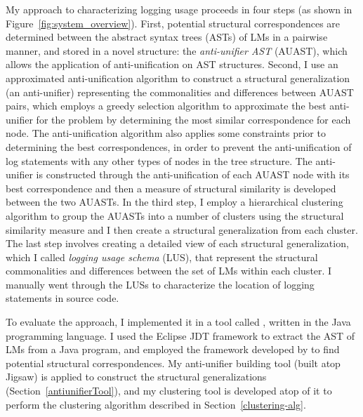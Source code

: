 My approach to characterizing logging usage proceeds in four steps (as shown in Figure~\ref{fig:system_overview}). First, potential structural correspondences are determined between the abstract syntax trees (ASTs) of LMs in a pairwise manner, and stored in a novel structure: the \emph{anti-unifier AST} (AUAST), which allows the application of anti-unification on AST structures. Second, I use an approximated anti-unification algorithm to construct a structural generalization (an anti-unifier) representing the commonalities and differences between AUAST pairs, which employs a greedy selection algorithm to approximate the best anti-unifier for the problem by determining the most similar correspondence for each node. The anti-unification algorithm also applies some constraints prior to determining the best correspondences, in order to prevent the anti-unification of log statements with any other types of nodes in the tree structure. The anti-unifier is constructed through the anti-unification of each AUAST node with its best correspondence and then a measure of structural similarity is developed between the two AUASTs. 
In the third step, I employ a hierarchical clustering algorithm to group the AUASTs into a number of clusters using the structural similarity measure and I then create a structural generalization from each cluster. The last step involves creating a detailed view of each structural generalization, which I called \emph{logging usage schema} (LUS), that represent the structural commonalities and differences between the set of LMs within each cluster. I manually went through the LUSs to characterize the location of logging statements in source code. 

To evaluate the approach, I implemented it in a tool called , written in the Java programming language. I used the Eclipse JDT framework to extract the AST of LMs from a Java program, and employed the  framework developed by \citet{2008:fse:cottrell} to find potential structural correspondences. My anti-unifier building tool (built atop Jigsaw) is applied to construct the structural generalizations (Section~\ref{antiunifierTool}), and my clustering tool is developed atop of it to perform the clustering algorithm described in Section~\ref{clustering-alg}. 

